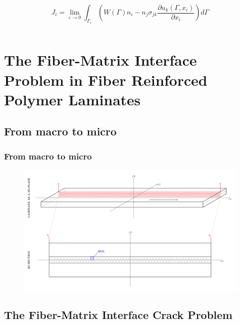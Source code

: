 \documentclass[first,firstsupp,lastsupp,handout,last,hyperref,table]{ETHclass}
\begin{document}
\begin{frame}
\begin{columns}
\begin{column}{0.5\textwidth}
\begin{itemize}[label=]
\begin{equation*}
J_{i}=\lim_{\varepsilon\to 0}\int_{\Gamma_{\varepsilon}}\left(W\left(\Gamma\right)n_{i}-n_{j}\sigma_{jk}\frac{\partial u_{k}\left(\Gamma,x_{i}\right)}{\partial x_{i}}\right)d\Gamma
\end{equation*}

\end{itemize}
\end{column}
\end{columns}
\end{frame}

\section[The Fiber-Matrix Interface Problem in FRPC]{The Fiber-Matrix Interface Problem in Fiber Reinforced Polymer Laminates}

\subsection{From macro to micro}

\begin{frame}
\frametitle{From macro to micro}
\vspace{-1cm}
\centering
\begin{figure}
\centering
\includegraphics[height=0.8\textheight]{laminate-section.pdf}
\label{fig:spread-tow-schematic}
\end{figure}
\end{frame}

\subsection{The Fiber-Matrix Interface Crack Problem}
\end{document}
